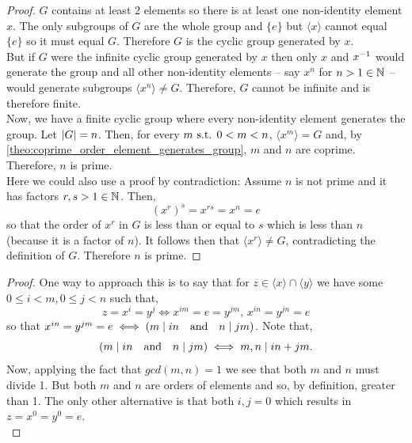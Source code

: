 \documentclass[MathsNotesBase.tex]{subfiles}
\begin{document}
{		
		\begin{proof}
			$G$ contains at least 2 elements so there is at least one non-identity element $x$. The only subgroups of $G$ are the whole group and ${ \{e\} }$ but ${ \langle x \rangle  }$ cannot equal ${ \{e\} }$ so it must equal $G$. Therefore $G$ is the cyclic group generated by $x$.\\
			But if $G$ were the infinite cyclic group generated by $x$ then only $x$ and ${x}^{-1}$ would generate the group and all other non-identity elements -- say $x^n$ for ${ n > 1 \in \mathbb{N}^{} }$ -- would generate subgroups ${ \langle x^n \rangle \neq G }$. Therefore, $G$ cannot be infinite and is therefore finite.\\
			Now, we have a finite cyclic group where every non-identity element generates the group. Let ${ \left\lvert G\right\rvert = n }$. Then, for every ${ m \text{ s.t. } 0 < m < n }$, ${ \langle x^m \rangle = G }$ and, by \autoref{theo:coprime_order_element_generates_group}, $m$ and $n$ are coprime. Therefore, $n$ is prime.\\
			Here we could also use a proof by contradiction: Assume $n$ is not prime and it has factors ${ r,s > 1 \in \mathbb{N}^{} }$. Then,
			\[ (x^r)^s = x^{rs} = x^n = e \]
			so that the order of $x^r$ in $G$ is less than or equal to $s$ which is less than $n$ (because it is a factor of $n$). It follows then that ${ \langle x^r \rangle \neq G }$, contradicting the definition of $G$. Therefore $n$ is prime.
		\end{proof}
	
		\bigskip
		\begin{proof}
			One way to approach this is to say that for ${ z \in \langle x \rangle \cap \langle y \rangle }$ we have some ${ 0 \leq i < m, 0 \leq j < n }$ such that,
			\[ z = x^i = y^j \iff x^{im} = e = y^{jm},\, x^{in} = y^{jn} = e \]
			so that ${ x^{in} = y^{jm} = e \iff (m \mid in \hspace{10pt}\text{and}\hspace{10pt} n \mid jm) }$. Note that,
			\[ (m \mid in \hspace{10pt}\text{and}\hspace{10pt} n \mid jm) \iff m,n \mid in + jm. \]
			Now, applying the fact that ${ gcd(m,n) = 1 }$ we see that both $m$ and $n$ must divide 1. But both $m$ and $n$ are orders of elements and so, by definition, greater than 1. The only other alternative is that both ${ i,j = 0 }$ which results in ${ z = x^0 = y^0 = e }$.\\
			

\end{proof}}
\end{document}
